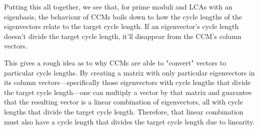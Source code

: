 \documentclass[a4paper, 12pt, reqno]{amsart}
\begin{document}
	Putting this all together, we see that, for prime moduli and LCAs with an eigenbasis, the behaviour of CCMs boils down to how the cycle lengths of the eigenvectors
	relate to the target cycle length. If an eigenvector's cycle length doesn't divide the target cycle length, it'll disappear from the CCM's column vectors.
	
	This gives a rough idea as to why CCMs are able to "convert" vectors to particular cycle lengths. By creating a matrix with only particular eigenvectors in its column
	vectors---specifically those eigenvectors with cycle lengths that divide the target cycle length---one can multiply a vector by that matrix and guarantee that the 
	resulting vector is a linear combination of eigenvectors, all with cycle lengths that divide the target cycle length. Therefore, that linear combination must also have
	a cycle length that divides the target cycle length due to linearity.
	
\end{document}

